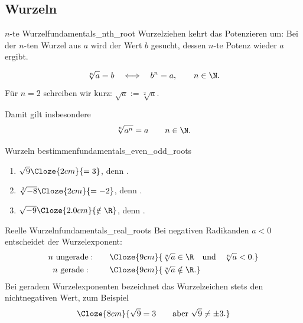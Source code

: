 \subsection{Wurzeln}
\label{subsec:fundamentals_roots}

\begin{samepage}
  \begin{DefinitionBox}{$n$-te Wurzel}{fundamentals_nth_root}
    Wurzelziehen kehrt das Potenzieren um: Bei der $n$-ten Wurzel aus $a$ wird
    der Wert $b$ gesucht, dessen $n$-te Potenz wieder $a$ ergibt.\par\smallskip
    \noindent
    \begin{minipage}[c]{0.54\linewidth}
      \[
        \sqrt[n]{a}=b
        \quad \Longleftrightarrow \quad
        b^n=a,
        \qquad n\in\N.
      \]
      Für $n=2$ schreiben wir kurz: $\sqrt a := \sqrt[2]{a}$.
    \end{minipage}\hfill
    \begin{minipage}[c]{0.4\linewidth}
      \centering
    \end{minipage}\par
  \end{DefinitionBox}

  Damit gilt insbesondere \[ \sqrt[n]{a^n}=a \qquad n\in\N. \]

  \vspace{-0.5\baselineskip}
  \begin{ExampleBox}{Wurzeln bestimmen}{fundamentals_even_odd_roots}
    \begin{enumerate}[label=\alph*),itemsep=0.55em]
      \item $\sqrt{9}\Cloze{2cm}{=3}$,
        denn .
      \item $\sqrt[3]{-8}\Cloze{2cm}{=-2}$,
        denn .
      \item $\sqrt{-9}\Cloze{2.0cm}{\notin\R}$,
        denn .
    \end{enumerate}
  \end{ExampleBox}
\end{samepage}

\begin{KeyPointBox}{Reelle Wurzeln}{fundamentals_real_roots}
  Bei negativen Radikanden $a<0$ entscheidet der Wurzelexponent:
  \[
    \begin{array}{c@{\qquad}l}
      n\text{ ungerade}: &
        \Cloze{9cm}{\sqrt[n]{a} \in \R \quad \text{und} \quad \sqrt[n]{a} < 0.}\\[0.35em]
      n\text{ gerade}:   &
        \Cloze{9cm}{\sqrt[n]{a} \notin \R .}
    \end{array}
  \]
  Bei geradem Wurzelexponenten bezeichnet das Wurzelzeichen stets den
  nichtnegativen Wert, zum Beispiel
  \[
    \Cloze{8cm}{\sqrt{9}=3
      \qquad \text{aber } \sqrt{9} \neq \pm3.}
  \]
\end{KeyPointBox}
